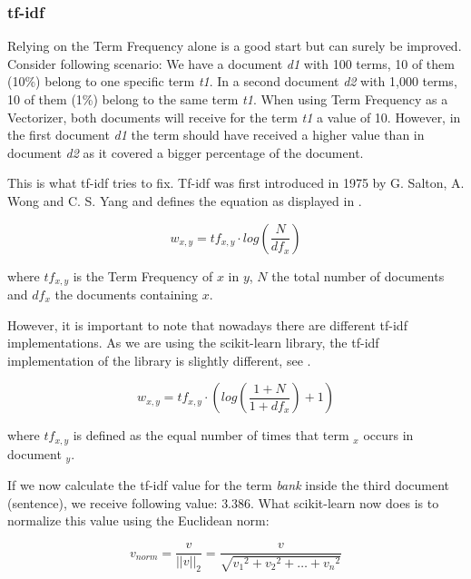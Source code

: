 \subsubsection{tf-idf}
\label{subsubsec:3_tf_idf}

Relying on the Term Frequency alone is a good start but can surely be improved.
Consider following scenario:
We have a document \textit{d1} with 100 terms, 10 of them (10\%) belong to one specific term \textit{t1}.
In a second document \textit{d2} with 1,000 terms, 10 of them (1\%) belong to the same term \textit{t1}.
When using Term Frequency as a Vectorizer, both documents will receive for the term \textit{t1} a value of 10.
However, in the first document \textit{d1} the term should have received a higher value
than in document \textit{d2} as it covered a bigger percentage of the document.

This is what tf-idf tries to fix.
Tf-idf was first introduced in 1975 by G. Salton, A. Wong and C. S. Yang\cite{salton1975}
and defines the equation as displayed in .

\begin{equation}
    w_{x,y} = tf_{x,y} \cdot log(\frac{N}{df_x})
    \label{equ:tfidf}
\end{equation}

where $tf_{x,y}$ is the Term Frequency of $x$ in $y$, $N$ the total number of documents
and $df_x$ the documents containing $x$.

However, it is important to note that nowadays there are different tf-idf implementations.
As we are using the scikit-learn\cite{scikit-learn} library,
the tf-idf implementation\cite{scikit_tfidf} of the library is slightly different,
see .

\begin{equation}
    w_{x,y} = tf_{x,y} \cdot (log(\frac{1+N}{1+df_x}) + 1)
    \label{equ:scikit_tfidf}
\end{equation}

where $tf_{x,y}$ is defined as the equal number of times that term ${_x}$ occurs in document ${_y}$.

If we now calculate the tf-idf value for the term \textit{bank} inside the third document (sentence),
we receive following value: $3.386$.
What scikit-learn now does is to normalize this value using the Euclidean norm:

\begin{equation}
    v_{norm} = \frac{v}{||v||_2} = \frac{v}{\sqrt{v_1{^2}+v_2{^2}+\ldots+v_n{^2}}}
    \label{equ:euclidean}
\end{equation}

